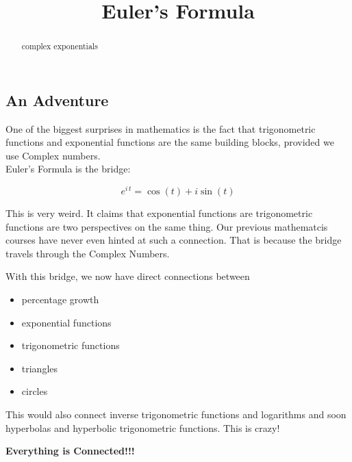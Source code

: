 \documentclass{ximera}
\title{Euler's Formula}
\begin{document}
\begin{abstract}
complex exponentials
\end{abstract}
\maketitle






\subsection*{An Adventure}




One of the biggest surprises in mathematics is the fact that trigonometric functions and exponential functions are the same building blocks, provided we use Complex numbers. \\


Euler's Formula is the bridge:



\[    e^{i \, t} = \cos(t) + i \sin(t)    \]



This is very weird.  It claims that exponential functions are trigonometric functions are two perspectives on the same thing.  Our previous mathematcis courses have never even hinted at such a connection.  That is because the bridge  travels through the Complex Numbers.



With this bridge, we now have direct connections between


\begin{itemize}
\item percentage growth
\item exponential functions
\item trigonometric functions
\item triangles
\item circles
\end{itemize}

This would also connect inverse trigonometric functions and logarithms and soon hyperbolas and hyperbolic trigonometric functions.  This is crazy!


\begin{center}
\textbf{\textcolor{red!80!black}{Everything is Connected!!!}}
\end{center}
\end{document}
